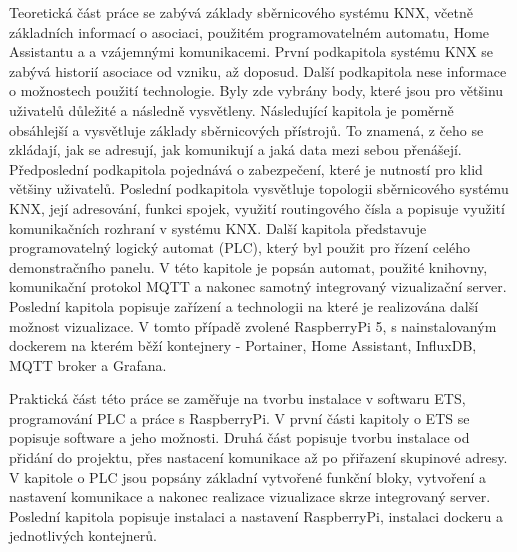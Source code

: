 Teoretická část práce se zabývá základy sběrnicového systému KNX, včetně základních informací o asociaci, použitém programovatelném automatu, Home Assistantu a a vzájemnými komunikacemi. První podkapitola systému KNX se zabývá historií asociace od vzniku, až doposud. Další podkapitola nese informace o možnostech použití technologie. Byly zde vybrány body, které jsou pro většinu uživatelů důležité a následně vysvětleny. Následující kapitola je poměrně obsáhlejší a vysvětluje základy sběrnicových přístrojů. To znamená, z čeho se zkládají, jak se adresují, jak komunikují a jaká data mezi sebou přenášejí. Předposlední podkapitola pojednává o zabezpečení, které je nutností pro klid většiny uživatelů. Poslední podkapitola vysvětluje topologii sběrnicového systému KNX, její adresování, funkci spojek, využití routingového čísla a popisuje využití komunikačních rozhraní v systému KNX. Další kapitola představuje programovatelný logický automat (PLC), který byl použit pro řízení celého demonstračního panelu. V této kapitole je popsán automat, použité knihovny, komunikační protokol MQTT a nakonec samotný integrovaný vizualizační server. Poslední kapitola popisuje zařízení a technologii na které je realizována další možnost vizualizace. V tomto případě zvolené RaspberryPi 5, s nainstalovaným dockerem na kterém běží kontejnery - Portainer, Home Assistant, InfluxDB, MQTT broker a Grafana.  

Praktická část této práce se zaměřuje na tvorbu instalace v softwaru ETS, programování PLC a práce s RaspberryPi. V první části kapitoly o ETS se popisuje software a jeho možnosti. Druhá část popisuje tvorbu instalace od přidání do projektu, přes nastacení komunikace až po přiřazení skupinové adresy. V kapitole o PLC jsou popsány základní vytvořené funkční bloky, vytvoření a nastavení komunikace a nakonec realizace vizualizace skrze integrovaný server. Poslední kapitola popisuje instalaci a nastavení RaspberryPi, instalaci dockeru a jednotlivých kontejnerů.